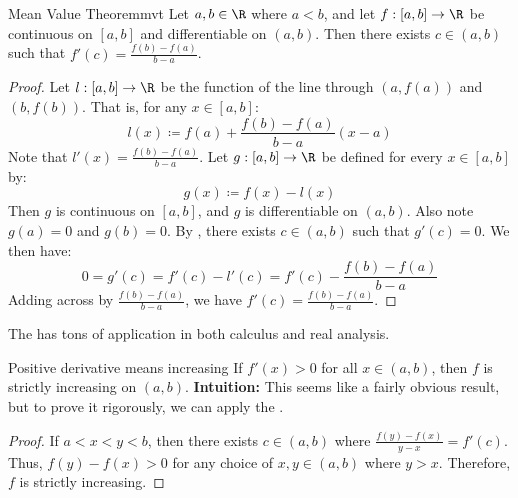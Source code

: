 \begin{thmbox}{Mean Value Theorem}{mvt}
    Let $a,b \in \R$ where $a < b$, and let $f : [a,b] \to \R$ be continuous on $[a,b]$ and differentiable on $(a,b)$. Then there exists $c \in (a,b)$ such that $f\prime(c) = \frac{f(b) - f(a)}{b-a}$.
    \tcblower
    \begin{proof}
        Let $l : [a,b] \to \R$ be the function of the line through $(a, f(a))$ and $(b, f(b))$. That is, for any $x \in [a,b]$:
        \[ l(x) \coloneq f(a) + \frac{f(b) - f(a)}{b - a} (x-a) \]
        Note that $l\prime(x) = \frac{f(b) - f(a)}{b-a}$. Let $g : [a,b] \to \R$ be defined for every $x \in [a,b]$ by:
        \[ g(x) \coloneq f(x) - l(x) \]
        Then $g$ is continuous on $[a,b]$, and $g$ is differentiable on $(a,b)$. Also note $g(a) = 0$ and $g(b) = 0$. By , there exists $c \in (a,b)$ such that $g\prime(c) = 0$. We then have:
        \[ 0 = g\prime(c) = f\prime(c) - l\prime(c) = f\prime(c) - \frac{f(b) - f(a)}{b-a} \]
        Adding across by $\frac{f(b)-f(a)}{b-a}$, we have $f\prime(c) = \frac{f(b) - f(a)}{b-a}$.
    \end{proof}
\end{thmbox}

The  has tons of application in both calculus and real analysis.

\begin{exbox}{Positive derivative means increasing}{}
    If $f\prime(x) > 0$ for all $x \in (a,b)$, then $f$ is strictly increasing on $(a,b)$.
    \tcblower
    \textbf{Intuition:} This seems like a fairly obvious result, but to prove it rigorously, we can apply the .
    \begin{proof}
        If $a < x < y < b$, then there exists $c \in (a,b)$ where $\frac{f(y) - f(x)}{y-x} = f\prime(c)$. Thus, $f(y) - f(x) > 0$ for any choice of $x,y \in (a,b)$ where $y > x$. Therefore, $f$ is strictly increasing.
    \end{proof}
\end{exbox}
